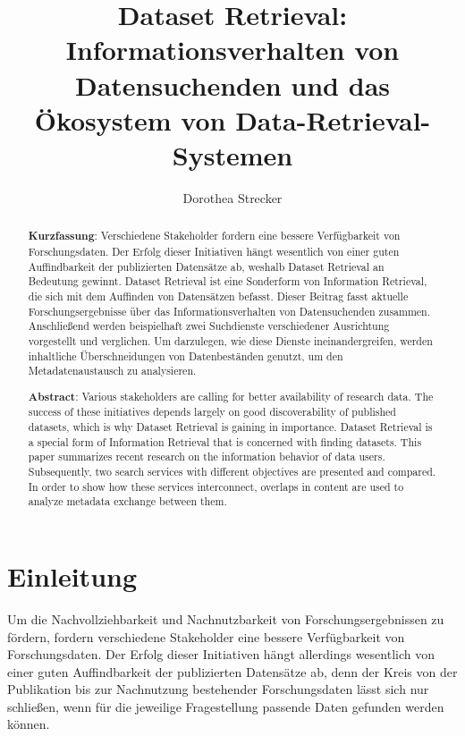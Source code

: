 \documentclass[a4paper,
fontsize=11pt,
oneside,
numbers=noperiodatend,
parskip=half-,
bibliography=totoc,
final
]{scrartcl}
\title{\LARGE{Dataset Retrieval: Informationsverhalten von Datensuchenden und das Ökosystem von Data-Retrieval-Systemen}}%
\author{Dorothea Strecker} %
\date{}
\begin{document}
\maketitle
\thispagestyle{fancyplain} 

\begin{abstract}
\noindent
\textbf{Kurzfassung}: Verschiedene Stakeholder fordern eine bessere
Verfügbarkeit von Forschungsdaten. Der Erfolg dieser Initiativen hängt
wesentlich von einer guten Auffindbarkeit der publizierten Datensätze
ab, weshalb Dataset Retrieval an Bedeutung gewinnt. Dataset Retrieval
ist eine Sonderform von Information Retrieval, die sich mit dem
Auffinden von Datensätzen befasst. Dieser Beitrag fasst aktuelle
Forschungsergebnisse über das Informationsverhalten von Datensuchenden
zusammen. Anschließend werden beispielhaft zwei Suchdienste
verschiedener Ausrichtung vorgestellt und verglichen. Um darzulegen, wie
diese Dienste ineinandergreifen, werden inhaltliche Überschneidungen von
Datenbeständen genutzt, um den Metadatenaustausch zu analysieren.

\noindent
\textbf{Abstract}: Various stakeholders are calling for better
availability of research data. The success of these initiatives depends
largely on good discoverability of published datasets, which is why
Dataset Retrieval is gaining in importance. Dataset Retrieval is a
special form of Information Retrieval that is concerned with finding
datasets. This paper summarizes recent research on the information
behavior of data users. Subsequently, two search services with different
objectives are presented and compared. In order to show how these
services interconnect, overlaps in content are used to analyze metadata
exchange between them.
\end{abstract}

\hypertarget{einleitung}{%
\section{Einleitung}\label{einleitung}}

Um die Nachvollziehbarkeit und Nachnutzbarkeit von Forschungsergebnissen
zu fördern, fordern verschiedene Stakeholder eine bessere Verfügbarkeit
von Forschungsdaten. Der Erfolg dieser Initiativen hängt allerdings
wesentlich von einer guten Auffindbarkeit der publizierten Datensätze
ab, denn der Kreis von der Publikation bis zur Nachnutzung bestehender
Forschungsdaten lässt sich nur schließen, wenn für die jeweilige
Fragestellung passende Daten gefunden werden können.
\end{document}
